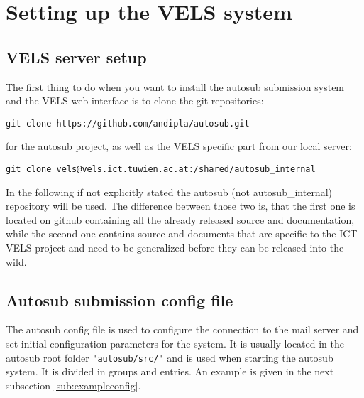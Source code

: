 \section{Setting up the VELS system} \label{setup}

\subsection{VELS server setup} \label{sub:serversetup}

The first thing to do when you want to install the autosub submission system and the VELS
web interface is to clone the git repositories:

\begin{verbatim}
git clone https://github.com/andipla/autosub.git
\end{verbatim}

for the autosub project, as well as the VELS specific part from our local server:

\begin{verbatim}
git clone vels@vels.ict.tuwien.ac.at:/shared/autosub_internal
\end{verbatim}

In the following if not explicitly stated the autosub (not autosub\_internal) repository
will be used. The difference between those two is, that the first one is located on github
containing all the already released source and documentation, while the second one contains
source and documents that are specific to the ICT VELS project and need to be generalized
before they can be released into the wild.

\subsection{Autosub submission config file}\label{sub:configfile}
The autosub config file is used to configure the connection to the mail server and set
initial configuration parameters for the system. It is usually located in the autosub root
folder {\tt "autosub/src/"} and is used when starting the autosub system. It is divided
in groups and entries. An example is given in the next subsection \ref{sub:exampleconfig}.

